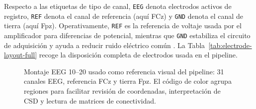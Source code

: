 Respecto a las etiquetas de tipo de canal, \texttt{EEG} denota electrodos activos de registro, \texttt{REF} denota el canal de referencia (aquí FCz) y \texttt{GND} denota el canal de tierra (aquí Fpz). Operativamente, \texttt{REF} es la referencia de voltaje usada por el amplificador para diferencias de potencial, mientras que \texttt{GND} estabiliza el circuito de adquisición y ayuda a reducir ruido eléctrico común \citep{Yamada2018}.
La Tabla~\ref{tab:electrode-layout-full} recoge la disposición completa de electrodos usada en el pipeline.

\begin{fullwidth}
\begin{figure}[H]
\centering
\resizebox{0.82\fulltextwidth}{!}{\NSEEGMontage}
\caption{Montaje EEG 10--20 usado como referencia visual del pipeline: 31 canales EEG, referencia FCz y tierra Fpz. El código de color agrupa regiones para facilitar revisión de coordenadas, interpretación de CSD y lectura de matrices de conectividad.}
\label{fig:generated-eeg-montage}
\end{figure}
\end{fullwidth}

